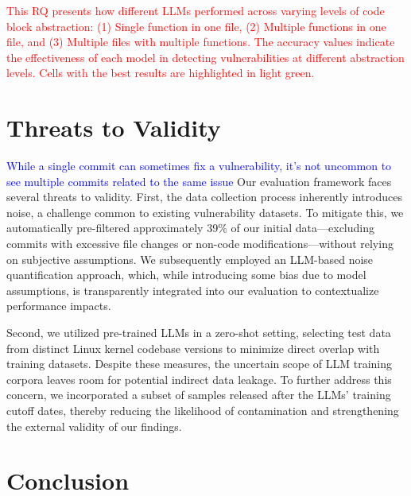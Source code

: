 \documentclass[sigconf,review,anonymous]{acmart}
\begin{document}
\begin{verbatim}

\end{verbatim}
\textcolor{red}{This RQ presents how different LLMs performed across varying levels of code block abstraction: (1) Single function in one file, (2) Multiple functions in one file, and (3) Multiple files with multiple functions. The accuracy values indicate the effectiveness of each model in detecting vulnerabilities at different abstraction levels. Cells with the best results are highlighted in light green.}




\section{Threats to Validity}
\textcolor{blue}{While a single commit can sometimes fix a vulnerability, it's not uncommon to see multiple commits related to the same issue}
Our evaluation framework faces several threats to validity. First, the data collection process inherently introduces noise, a challenge common to existing vulnerability datasets. To mitigate this, we automatically pre-filtered approximately 39\% of our initial data—excluding commits with excessive file changes or non-code modifications—without relying on subjective assumptions. We subsequently employed an LLM-based noise quantification approach, which, while introducing some bias due to model assumptions, is transparently integrated into our evaluation to contextualize performance impacts.

Second, we utilized pre-trained LLMs in a zero-shot setting, selecting test data from distinct Linux kernel codebase versions to minimize direct overlap with training datasets. Despite these measures, the uncertain scope of LLM training corpora leaves room for potential indirect data leakage. To further address this concern, we incorporated a subset of samples released after the LLMs' training cutoff dates, thereby reducing the likelihood of contamination and strengthening the external validity of our findings.


\section{Conclusion}
\label{section:conclusion}
\end{document}

